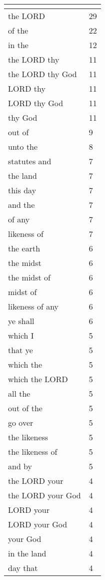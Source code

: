 \begin{center}
\begin{longtable}{|p{3.0in}|p{0.5in}|}
\hline \multicolumn{2}{c}{{ }} \\ \hline
\endfoot 
the LORD & 29\\ \hline 
of the & 22\\ \hline 
in the & 12\\ \hline 
the LORD thy & 11\\ \hline 
the LORD thy God & 11\\ \hline 
LORD thy & 11\\ \hline 
LORD thy God & 11\\ \hline 
thy God & 11\\ \hline 
out of & 9\\ \hline 
unto the & 8\\ \hline 
statutes and & 7\\ \hline 
the land & 7\\ \hline 
this day & 7\\ \hline 
and the & 7\\ \hline 
of any & 7\\ \hline 
likeness of & 7\\ \hline 
the earth & 6\\ \hline 
the midst & 6\\ \hline 
the midst of & 6\\ \hline 
midst of & 6\\ \hline 
likeness of any & 6\\ \hline 
ye shall & 6\\ \hline 
which I & 5\\ \hline 
that ye & 5\\ \hline 
which the & 5\\ \hline 
which the LORD & 5\\ \hline 
all the & 5\\ \hline 
out of the & 5\\ \hline 
go over & 5\\ \hline 
the likeness & 5\\ \hline 
the likeness of & 5\\ \hline 
and by & 5\\ \hline 
the LORD your & 4\\ \hline 
the LORD your God & 4\\ \hline 
LORD your & 4\\ \hline 
LORD your God & 4\\ \hline 
your God & 4\\ \hline 
in the land & 4\\ \hline 
day that & 4\\ \hline 

\end{longtable}
\end{center}
